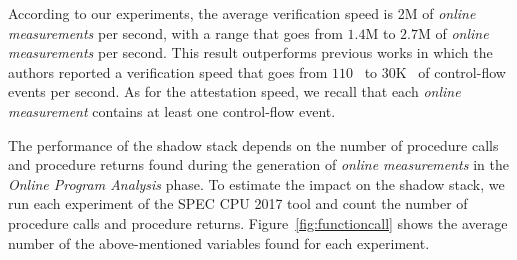 According to our experiments, the average verification speed is 2M of 
\emph{online measurements} per second, with a range that goes from $1.4$M to 
$2.7$M of \emph{online measurements} per second. This result outperforms 
previous works in which the authors reported a verification speed that goes 
from $110$~\citep{Dessouky:2018:LLH:3240765.3240821} to $30$K~\citep{aberadiat} 
of control-flow events per second. As for the attestation speed, we recall that 
each \emph{online measurement} contains at least one control-flow event.

The performance of the shadow stack depends on the number of 
procedure calls and procedure returns found during the generation of 
\emph{online measurements} in the \emph{Online Program Analysis} phase. 
To estimate the impact on the shadow stack, we run each experiment of the SPEC 
CPU 2017 tool and count the number of procedure calls and procedure returns. 
Figure~\ref{fig:functioncall} shows the average number of the above-mentioned 
variables found for each experiment. 
